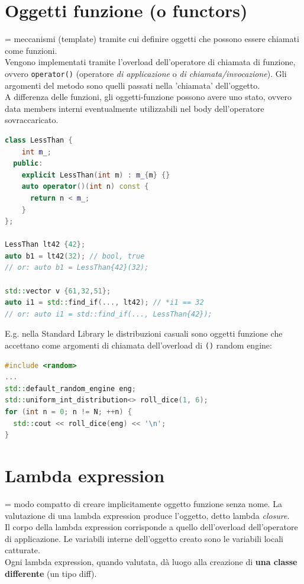 \documentclass[10pt, oneside]{book}
\begin{document}
\section{Oggetti funzione (o functors)}
= meccanismi (template) tramite cui definire oggetti che possono essere chiamati come funzioni.\\
Vengono implementati tramite l'overload dell'operatore di chiamata di funzione, ovvero \texttt{operator()} (operatore \textit{di applicazione} o \textit{di chiamata/invocazione}). Gli argomenti del metodo sono quelli passati nella 'chiamata' dell'oggetto.\\
A differenza delle funzioni, gli oggetti-funzione possono avere uno stato, ovvero data members interni eventualmente utilizzabili nel body dell'operatore sovraccaricato.
\begin{lstlisting}[language=C++]
class LessThan {
    int m_;
  public:
    explicit LessThan(int m) : m_{m} {}
    auto operator()(int n) const {
      return n < m_;
    }
};

LessThan lt42 {42};
auto b1 = lt42(32); // bool, true
// or: auto b1 = LessThan{42}(32);

std::vector v {61,32,51};
auto i1 = std::find_if(..., lt42); // *i1 == 32
// or: auto i1 = std::find_if(..., LessThan{42});
\end{lstlisting}
E.g. nella Standard Library le distribuzioni casuali sono oggetti funzione che accettano come argomenti di chiamata dell'overload di \texttt{()} random engine:
\begin{lstlisting}[language=C++]
#include <random>
...
std::default_random_engine eng;
std::uniform_int_distribution<> roll_dice(1, 6);
for (int n = 0; n != N; ++n) {
  std::cout << roll_dice(eng) << '\n';
}
\end{lstlisting}

\section{Lambda expression}
= modo compatto di creare implicitamente oggetto funzione senza nome. La valutazione di una lambda expression produce l'oggetto, detto lambda \textit{closure}.\\
Il corpo della lambda expression corrisponde a quello dell'overload dell'operatore di applicazione. Le variabili interne dell'oggetto creato sono le variabili locali catturate.\\
Ogni lambda expression, quando valutata, dà luogo alla creazione di \textbf{una classe differente} (un tipo diff).
\end{document}
